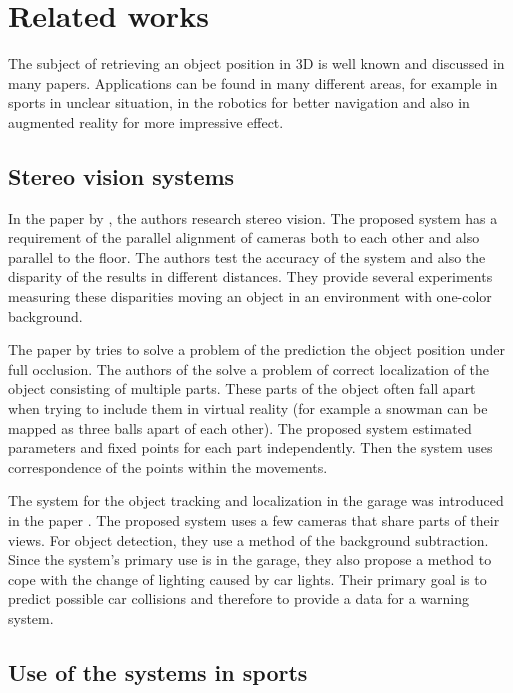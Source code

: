 \chapter{Related works} 

The subject of retrieving an object position in 3D is well known and discussed
in many papers. Applications can be found in many different areas, for example in
sports in unclear situation, in the robotics for better navigation and
also in augmented reality for more impressive effect.

\section{Stereo vision systems}

In the paper by \citet*{zheng2010study}, the authors research stereo vision. The
proposed system has a requirement of the parallel alignment of cameras both to
each other and also parallel to the floor. The authors test the accuracy of the
system and also the disparity of the results in different distances. They
provide several experiments measuring these disparities moving an object in an
environment with one-color background.

The paper by \citet*{black2002multi} tries to solve a problem of the prediction
the object position under full occlusion. The authors of the
\citet*{yonemoto1998tracking} solve a problem of correct localization of the
object consisting of multiple parts. These parts of the object often fall apart
when trying to include them in virtual reality (for example a snowman can be
mapped as three balls apart of each other). The proposed system estimated
parameters and fixed points for each part independently. Then the system uses
correspondence of the points within the movements.

The system for the object tracking and localization in the garage was introduced
in the paper \citet*{ibisch2015arbitrary}. The proposed system uses a few cameras
that share parts of their views. For object detection, they use a method of the
background subtraction. Since the system's primary use is in the garage, they
also propose a method to cope with the change of lighting caused by car
lights. Their primary goal is to predict possible car collisions and therefore
to provide a data for a warning system.

\section{Use of the systems in sports}

